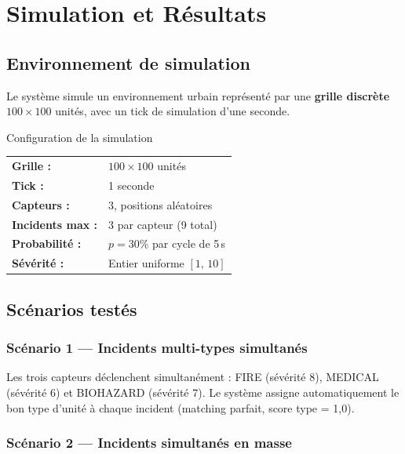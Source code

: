 \documentclass[12pt, a4paper]{report}
\begin{document}
\chapter{Simulation et Résultats}
\label{chap:simulation}

\section{Environnement de simulation}

Le système simule un environnement urbain représenté par une \textbf{grille discrète
$100 \times 100$} unités, avec un tick de simulation d'une seconde.

\begin{infobox}{Configuration de la simulation}
\begin{tabular}{@{}ll}
\textbf{Grille :}         & $100 \times 100$ unités \\
\textbf{Tick :}           & 1 seconde \\
\textbf{Capteurs :}       & 3, positions aléatoires \\
\textbf{Incidents max :}  & 3 par capteur (9 total) \\
\textbf{Probabilité :}    & $p = 30\%$ par cycle de 5\,s \\
\textbf{Sévérité :}       & Entier uniforme $[1,\,10]$ \\
\end{tabular}
\end{infobox}

\section{Scénarios testés}

\subsection{Scénario 1 — Incidents multi-types simultanés}

Les trois capteurs déclenchent simultanément : FIRE (sévérité 8), MEDICAL (sévérité 6)
et BIOHAZARD (sévérité 7). Le système assigne automatiquement le bon type d'unité à
chaque incident (matching parfait, score type = 1,0).

\subsection{Scénario 2 — Incidents simultanés en masse}
\end{document}
